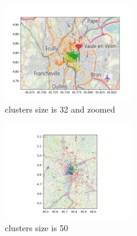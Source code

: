 \documentclass{article}
\begin{document}
\begin{figure}[!h]
  \centering
  \includegraphics[width=0.5\textwidth]{clustering_32_zoomed.png}
  \caption{clusters size is 32 and zoomed}
	\label{fig:clusters_32_zoomed}
\end{figure}

\begin{figure}[!h]
  \centering
  \includegraphics[width=0.5\textwidth]{clustering_50.png}
  \caption{clusters size is 50}
	\label{fig:clusters_50}
\end{figure}
\end{document}
